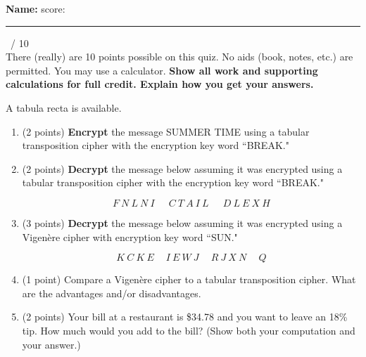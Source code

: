 \documentclass[12pt]{article}
\def\be{\begin{enumerate}}
\def\ee{\end{enumerate}}
\newcommand{\ans}[1][1in]{\rule{#1}{.5pt}}
\begin{document}
\vspace{1cm}
\strut

\noindent \textbf{Name:} \hrulefill \quad  score:\ans[1cm] \ / 10 \\


\noindent There (really) are 10 points possible on this quiz. No aids (book, notes, etc.)
are permitted. You may use a calculator.  {\bf Show all work and supporting calculations for full credit. Explain how you get your answers.}

A tabula recta is available.
\be

\item (2 points)  \textbf{Encrypt} the message SUMMER TIME using a tabular transposition cipher with the encryption key word ``BREAK."

\vfill

\item (2 points)  \textbf{Decrypt} the message  below assuming it was encrypted using a tabular transposition cipher with the encryption key word ``BREAK."

$$F\:N\:L\:N\:I\:\:\quad C\:T\:A\:I\:L\:\:\quad D\:L\:E\:X\:H$$


\vfill
\newpage


\item (3 points) \textbf{Decrypt} the message below assuming it was encrypted using a Vigen\`{e}re cipher with encryption key word ``SUN."

$$K\:C\:K\:E\:\quad I\:E\:W\:J \:\quad R\:J\:X\:N \:\quad Q$$


\vfill


\item (1 point)  Compare a Vigen\`{e}re cipher to a tabular transposition cipher. What are the advantages and/or disadvantages.
\vfill
\item (2 points) Your bill at a restaurant is \$34.78 and you want to leave an 18\% tip. How much would you add to the bill? (Show both your computation and your answer.)
\vfill
\ee
\end{document}
